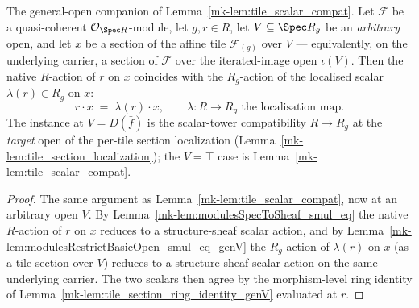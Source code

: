 \begin{lemma}\label{mk-lem:tile_scalar_compat_genV}
  \leanok

  The general-open companion of Lemma~\ref{mk-lem:tile_scalar_compat}. Let \(\mathcal{F}\) be a
  quasi-coherent \(\mathcal{O}_{\Spec R}\)-module, let \(g, r \in R\), let \(V \subseteq \Spec R_g\) be
  an \emph{arbitrary} open, and let \(x\) be a section of the affine tile \(\mathcal{F}_{(g)}\) over
  \(V\) --- equivalently, on the underlying carrier, a section of \(\mathcal{F}\) over the
  iterated-image open \(\iota(V)\). Then the native \(R\)-action of \(r\) on \(x\) coincides with the
  \(R_g\)-action of the localised scalar \(\lambda(r) \in R_g\) on \(x\):
  \[
    r \cdot x \;=\; \lambda(r) \cdot x,
    \qquad \lambda : R \to R_g \text{ the localisation map}.
  \]
  The instance at \(V = D(\bar f)\) is the scalar-tower compatibility \(R \to R_g\) at the \emph{target}
  open of the per-tile section localization (Lemma~\ref{mk-lem:tile_section_localization}); the
  \(V = \top\) case is Lemma~\ref{mk-lem:tile_scalar_compat}.
\end{lemma}
\begin{proof}
  \leanok
    The same argument as Lemma~\ref{mk-lem:tile_scalar_compat}, now at an arbitrary open \(V\). By
  Lemma~\ref{mk-lem:modulesSpecToSheaf_smul_eq} the native \(R\)-action of \(r\) on \(x\) reduces to a
  structure-sheaf scalar action, and by Lemma~\ref{mk-lem:modulesRestrictBasicOpen_smul_eq_genV} the
  \(R_g\)-action of \(\lambda(r)\) on \(x\) (as a tile section over \(V\)) reduces to a structure-sheaf
  scalar action on the same underlying carrier. The two scalars then agree by the morphism-level ring
  identity of Lemma~\ref{mk-lem:tile_section_ring_identity_genV} evaluated at \(r\).
\end{proof}

